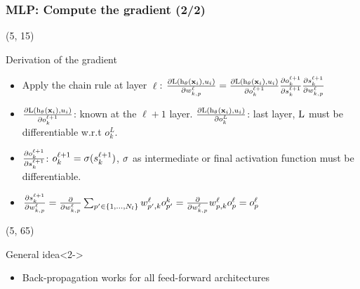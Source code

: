 \begin{frame}
  \frametitle{\acl{MLP}: Compute the gradient (2/2)}

  \begin{textblock}{90}(5, 15)
    \begin{block}{Derivation of the gradient}
      \begin{itemize}
      \item Apply the chain rule at layer $\ell$:
        $
        \frac{\partial \mathrm{L} \left ( {\mathrm{h}_{\mathbf{\theta}} \left ( {\mathbf{x}_i} \right ), u_i} \right )}{\partial w_{k,p}^\ell} =
        \frac{\partial \mathrm{L} \left ( {\mathrm{h}_{\mathbf{\theta}} \left ( {\mathbf{x}_i} \right ), u_i} \right )}{\partial o_k^{\ell+1}} \frac{\partial o_k^{\ell+1}}{\partial s_k^{\ell+1}} \frac{\partial s_k^{\ell+1}}{\partial w_{k,p}^{\ell}}
        $

      \item $\frac{\partial \mathrm{L} \left ( {\mathrm{h}_{\mathbf{\theta}} \left ( {\mathbf{x}_i} \right ), u_i} \right )}{\partial o_k^{\ell+1}}$: known at the $\ell+1$ layer. $\frac{\partial \mathrm{L} \left ( {\mathrm{h}_{\mathbf{\theta}} \left ( {\mathbf{x}_i} \right ), u_i} \right )}{\partial o_k^{L}}$: last layer, $\mathrm{L}$ must be differentiable w.r.t $o_k^{L}$.


      \item $\frac{\partial o_k^{\ell+1}}{\partial s_k^{\ell+1}}$: $o_k^{\ell+1} = \mathrm{\sigma}(s_k^{\ell+1})$, $\mathrm{\sigma}$ as intermediate or final activation function must be differentiable.

      \item $\frac{\partial s_k^{\ell+1}}{\partial w_{k,p}^{\ell}} = \frac{\partial }{\partial w_{k,p}^{\ell}} \sum_{p' \in \left\{1,\ldots,N_l \right\}}  w_{p', k}^{\ell}o_{p'}^{k}= \frac{\partial }{\partial w_{k,p}^{\ell}}  w_{p, k}^{\ell}o_{p}^{\ell}=o_{p}^{\ell}$

    \end{itemize}
    \end{block}
  \end{textblock}

  \begin{textblock}{90}(5, 65)
    \begin{block}{General idea}<2->
      \begin{itemize}
      \item Back-propagation works for all feed-forward architectures
        \hyperlink{MLP_Learning_2}{}
      \end{itemize}
    \end{block}
  \end{textblock}
\end{frame}
